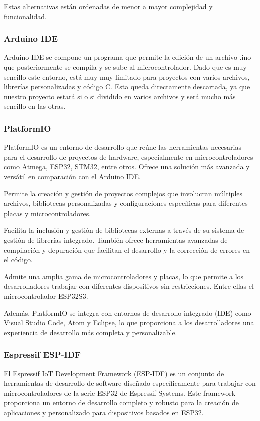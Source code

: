 Estas alternativas están ordenadas de menor a mayor complejidad y funcionalidad.
\subsubsection{Arduino IDE}
\gls{Arduino} IDE se compone un programa que permite la edición de un archivo .ino que posteriormente se compila y se sube al microcontrolador. Dado que es muy sencillo este entorno, está muy muy limitado para proyectos con varios archivos, librerías personalizadas y código C. Esta queda directamente descartada, ya que nuestro proyecto estará si o si dividido en varios archivos y será mucho más sencillo en las otras.

\subsubsection{\gls{PlatformIO}} \label{DiseñoPlatformIO}
\gls{PlatformIO} es un entorno de desarrollo que reúne las herramientas necesarias para el desarrollo de proyectos de hardware, especialmente en microcontroladores como Atmega, ESP32, STM32, entre otros. Ofrece una solución más avanzada y versátil en comparación con el \gls{Arduino} IDE.

Permite la creación y gestión de proyectos complejos que involucran múltiples archivos, bibliotecas personalizadas y configuraciones específicas para diferentes placas y microcontroladores.

Facilita la inclusión y gestión de bibliotecas externas a través de su sistema de gestión de librerías integrado. También ofrece herramientas avanzadas de compilación y depuración que facilitan el desarrollo y la corrección de errores en el código.

Admite una amplia gama de microcontroladores y placas, lo que permite a los desarrolladores trabajar con diferentes dispositivos sin restricciones. Entre ellas el microcontrolador ESP32S3.

Además, \gls{PlatformIO} se integra con entornos de desarrollo integrado (IDE) como Visual Studio Code, Atom y Eclipse, lo que proporciona a los desarrolladores una experiencia de desarrollo más completa y personalizable.

\subsubsection{Espressif ESP-IDF}
El Espressif \gls{IoT} Development Framework (ESP-IDF) es un conjunto de herramientas de desarrollo de software diseñado específicamente para trabajar con microcontroladores de la serie ESP32 de Espressif Systems. Este framework proporciona un entorno de desarrollo completo y robusto para la creación de aplicaciones y  personalizado para dispositivos basados en ESP32.

